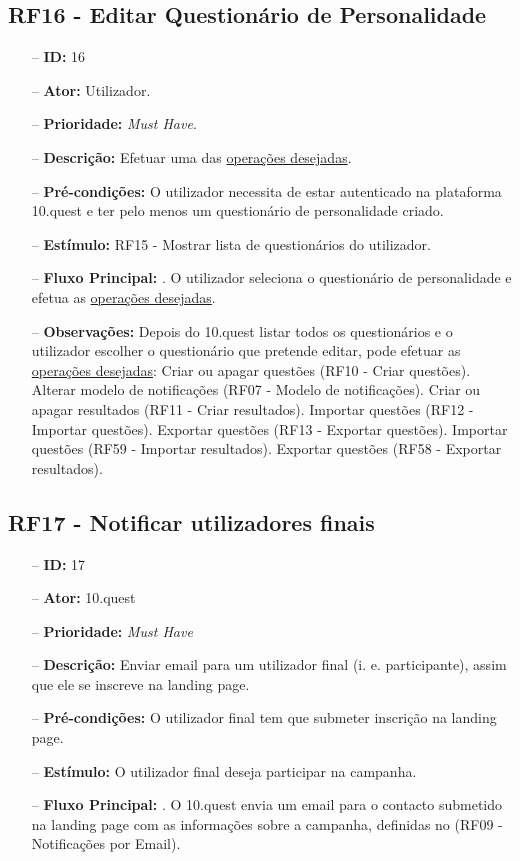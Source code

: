 \subsection{RF16 - Editar Questionário de Personalidade}
\begin{itemize}
	\item[--] \textbf{ID:} 16
	\item[--]  \textbf{Ator:} Utilizador.
	\item[--]  \textbf{Prioridade:} \textit{Must Have}.
	\item[--]  \textbf{Descrição:} Efetuar uma das \underline{operações desejadas}.
	\item[--]  \textbf{Pré-condições:} O utilizador necessita de estar autenticado na plataforma 10.quest e ter pelo menos um questionário de personalidade criado.
	\item[--]  \textbf{Estímulo:} RF15 - Mostrar lista de questionários do utilizador.
	\item[--]  \textbf{Fluxo Principal:} 
		. O utilizador seleciona o questionário de personalidade e efetua as \underline{operações desejadas}.
	\item[--]  \textbf{Observações:} Depois do 10.quest listar todos os questionários e o utilizador escolher o questionário que pretende editar, pode efetuar as \underline{operações desejadas}:
		\subitem Criar ou apagar questões (RF10 - Criar questões).
		\subitem Alterar modelo de notificações (RF07 - Modelo de notificações).
		\subitem Criar ou apagar resultados (RF11 - Criar resultados).
		\subitem Importar questões (RF12 - Importar questões).
		\subitem Exportar questões (RF13 - Exportar questões).
		\subitem Importar questões (RF59 - Importar resultados).
		\subitem Exportar questões (RF58 - Exportar resultados).
\end{itemize}
\newpage


\subsection{RF17 - Notificar utilizadores finais}
\begin{itemize}
	\item[--] \textbf{ID:} 17
	\item[--]  \textbf{Ator:} 10.quest
	\item[--]  \textbf{Prioridade:} \textit{Must Have}
	\item[--]  \textbf{Descrição:} Enviar email para um utilizador final (i. e. participante), assim que ele se inscreve na landing page.
	\item[--]  \textbf{Pré-condições:} O utilizador final tem que submeter inscrição na landing page.
	\item[--]  \textbf{Estímulo:} O utilizador final deseja participar na campanha.
	\item[--]  \textbf{Fluxo Principal:} 
		. O 10.quest envia um email para o contacto submetido na landing page com as informações sobre a campanha, definidas no (RF09 - Notificações por Email).
\end{itemize}
\newpage

